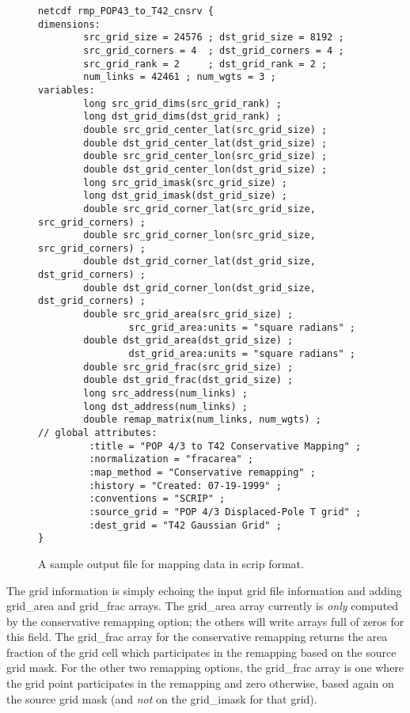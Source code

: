\documentclass[12pt]{report}
\begin{document}
\begin{figure}
\caption{A sample output file for mapping data in scrip format.
\label{fig:ncrmp}}
\begin{verbatim}
netcdf rmp_POP43_to_T42_cnsrv {
dimensions:
        src_grid_size = 24576 ; dst_grid_size = 8192 ;
        src_grid_corners = 4  ; dst_grid_corners = 4 ;
        src_grid_rank = 2     ; dst_grid_rank = 2 ;
        num_links = 42461 ; num_wgts = 3 ;
variables:
        long src_grid_dims(src_grid_rank) ;
        long dst_grid_dims(dst_grid_rank) ;
        double src_grid_center_lat(src_grid_size) ;
        double dst_grid_center_lat(dst_grid_size) ;
        double src_grid_center_lon(src_grid_size) ;
        double dst_grid_center_lon(dst_grid_size) ;
        long src_grid_imask(src_grid_size) ;
        long dst_grid_imask(dst_grid_size) ;
        double src_grid_corner_lat(src_grid_size, src_grid_corners) ;
        double src_grid_corner_lon(src_grid_size, src_grid_corners) ;
        double dst_grid_corner_lat(dst_grid_size, dst_grid_corners) ;
        double dst_grid_corner_lon(dst_grid_size, dst_grid_corners) ;
        double src_grid_area(src_grid_size) ;
                src_grid_area:units = "square radians" ;
        double dst_grid_area(dst_grid_size) ;
                dst_grid_area:units = "square radians" ;
        double src_grid_frac(src_grid_size) ;
        double dst_grid_frac(dst_grid_size) ;
        long src_address(num_links) ;
        long dst_address(num_links) ;
        double remap_matrix(num_links, num_wgts) ;
// global attributes:
         :title = "POP 4/3 to T42 Conservative Mapping" ;
         :normalization = "fracarea" ;
         :map_method = "Conservative remapping" ;
         :history = "Created: 07-19-1999" ;
         :conventions = "SCRIP" ;
         :source_grid = "POP 4/3 Displaced-Pole T grid" ;
         :dest_grid = "T42 Gaussian Grid" ;
}
\end{verbatim}
\end{figure}

The grid information is simply echoing the input grid file
information and adding grid\_area and grid\_frac arrays.
The grid\_area array currently is {\em only} computed by
the conservative remapping option; the others will write
arrays full of zeros for this field.  The grid\_frac array
for the conservative remapping returns the area fraction
of the grid cell which participates in the remapping based
on the source grid mask.  For the other two remapping options,
the grid\_frac array is one where the grid point participates
in the remapping and zero otherwise, based again on the
source grid mask (and {\em not} on the grid\_imask for that
grid).
\end{document}
